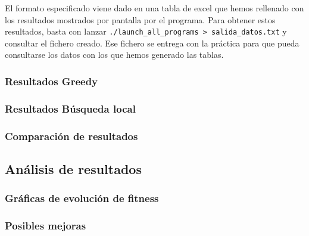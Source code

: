 \documentclass[11pt]{article}
\begin{document}
El formato especificado viene dado en una tabla de excel que hemos rellenado con los resultados mostrados por pantalla por el programa. Para obtener estos resultados, basta con lanzar \lstinline{./launch_all_programs > salida_datos.txt} y consultar el fichero creado. Ese fichero se entrega con la práctica para que pueda consultarse los datos con los que hemos generado las tablas.

\subsubsection{Resultados Greedy}

\subsubsection{Resultados Búsqueda local}

\subsubsection{Comparación de resultados}


\subsection{Análisis de resultados}

\subsubsection{Gráficas de evolución de fitness}

\subsubsection{Posibles mejoras}
\end{document}
